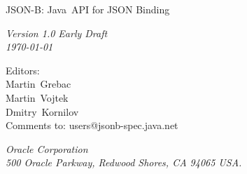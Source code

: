 \begin{titlepage}
\raggedleft

\vspace*{60pt}

{\Huge
\textsf{JSON-B: Java\texttrademark\ API for JSON Binding}}

\vspace{20pt}

{
\Large\textit{Version 1.0 Early Draft\\
\today}\\
}

\vspace{40pt}

{\large Editors:\\
Martin\ Grebac\\
Martin\ Vojtek\\
Dmitry\ Kornilov\\
\vspace{10pt}Comments to: users@jsonb-spec.java.net
}

\vspace{80pt}

{\small\textit{Oracle Corporation\\
500 Oracle Parkway, Redwood Shores, CA 94065 USA.}
}
\end{titlepage} 
